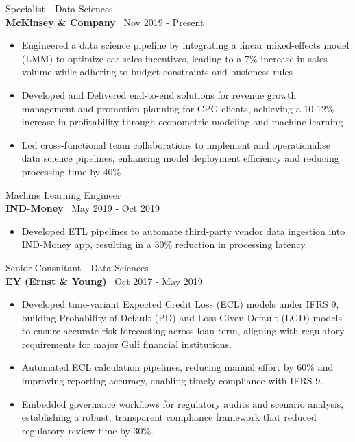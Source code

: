 \documentclass[a4paper,10pt]{article}
\begin{document}
{\large Specialist - Data Sciences} \\
\textbf{McKinsey \& Company} \hfill \faCalendar \, Nov 2019 - Present
\begin{itemize}[noitemsep, topsep=0pt] %
    \item Engineered a data science pipeline by integrating a linear mixed-effects model (LMM) to optimize car sales incentives, leading to a 7\% increase in sales volume while adhering to budget constraints and busioness rules
    \item Developed and Delivered end-to-end solutions for revenue growth management and promotion planning for CPG clients, achieving a 10-12\% increase in profitability through econometric modeling and machine learning
    \item Led cross-functional team collaborations to implement and operationalise data science pipelines, enhancing model deployment efficiency and reducing processing time by 40\%
\end{itemize}

{\large Machine Learning Engineer} \\
\textbf{IND-Money} \hfill \faCalendar \, May 2019 - Oct 2019
\begin{itemize}[noitemsep, topsep=0pt]
    \item Developed ETL pipelines to automate third-party vendor data ingestion into IND-Money app, resulting in a 30\% reduction in processing latency.
\end{itemize}

{\large Senior Consultant - Data Sciences} \\
\textbf{EY (Ernst \& Young)} \hfill \faCalendar \, Oct 2017 - May 2019
\begin{itemize}[noitemsep, topsep=0pt]
    \item Developed time-variant Expected Credit Loss (ECL) models under IFRS 9, building Probability of Default (PD) and Loss Given Default (LGD) models to ensure accurate risk forecasting across loan term, aligning with regulatory requirements for major Gulf financial institutions.
    \item Automated ECL calculation pipelines, reducing manual effort by 60\% and improving reporting accuracy, enabling timely compliance with IFRS 9.
    \item Embedded governance workflows for regulatory audits and scenario analysis, establishing a robust, transparent compliance framework that reduced regulatory review time by 30\%.
\end{itemize}
\end{document}
